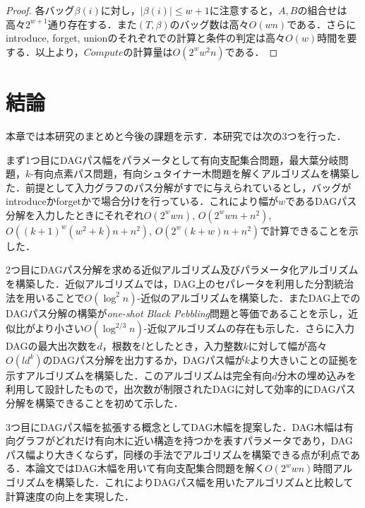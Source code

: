 \documentclass[master]{kuisthesis}		%
\theoremstyle{plain}
\theoremstyle{definition}
\begin{document}
\begin{proof}
    各バッグ$\beta(i)$に対し，$|\beta(i)| \leq w+1$に注意すると，$A, B$の組合せは高々$2^{w+1}$通り存在する．また$(T, \beta)$のバッグ数は高々$O(wn)$である．さらにintroduce, forget, unionのそれぞれでの計算と条件の判定は高々$O(w)$時間を要する．以上より，$Compute$の計算量は$O(2^ww^2n)$である．
\end{proof}





















\section{結論} %
本章では本研究のまとめと今後の課題を示す．本研究では次の3つを行った．

まず1つ目にDAGパス幅をパラメータとして有向支配集合問題，最大葉分岐問題，$k$-有向点素パス問題，有向シュタイナー木問題を解くアルゴリズムを構築した．前提として入力グラフのパス分解がすでに与えられているとし，バッグがintroduceかforgetかで場合分けを行っている．これにより幅が$w$であるDAGパス分解を入力したときにそれぞれ$O(2^w w n)$, $O(2^w w n + n^2)$, $O((k+1)^w(w^2+k)n+n^2)$, $O(2^w (k + w)n + n^2)$で計算できることを示した．

2つ目にDAGパス分解を求める近似アルゴリズム及びパラメータ化アルゴリズムを構築した．近似アルゴリズムでは，DAG上のセパレータを利用した分割統治法を用いることで$O(\log^2 n)$-近似のアルゴリズムを構築した．またDAG上でのDAGパス分解の構築が\textit{one-shot Black Pebbling}問題と等価であることを示し，近似比がより小さい$O(\log^{2/3} n)$-近似アルゴリズムの存在も示した．さらに入力DAGの最大出次数を$d$，根数を$l$としたとき，入力整数$k$に対して幅が高々$O(ld^k)$のDAGパス分解を出力するか，DAGパス幅が$k$より大きいことの証拠を示すアルゴリズムを構築した．このアルゴリズムは完全有向$d$分木の埋め込みを利用して設計したもので，出次数が制限されたDAGに対して効率的にDAGパス分解を構築できることを初めて示した．

3つ目にDAGパス幅を拡張する概念としてDAG木幅を提案した．DAG木幅は有向グラフがどれだけ有向木に近い構造を持つかを表すパラメータであり，DAGパス幅より大きくならず，同様の手法でアルゴリズムを構築できる点が利点である．本論文ではDAG木幅を用いて有向支配集合問題を解く$O(2^w w n)$時間アルゴリズムを構築した．これによりDAGパス幅を用いたアルゴリズムと比較して計算速度の向上を実現した．
\end{document}
